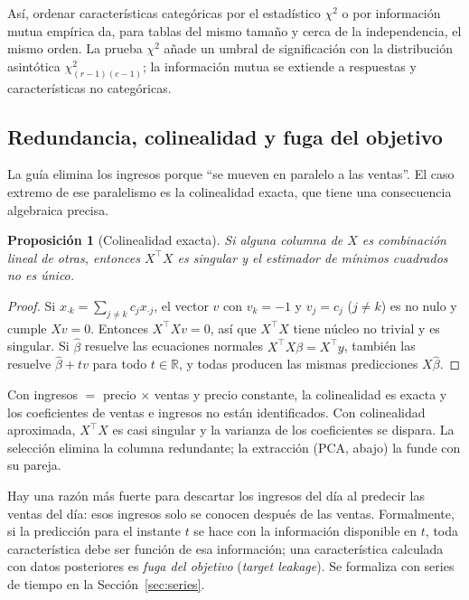 \documentclass[11pt]{article}
\newtheorem{proposicion}[teorema]{Proposición}
\theoremstyle{definition}
\theoremstyle{remark}
\newcommand{\R}{\mathbb{R}}
\begin{document}
\noindent Así, ordenar características categóricas por el estadístico $\chi^2$ o por información mutua empírica da, para tablas del mismo tamaño y cerca de la independencia, el mismo orden. La prueba $\chi^2$ añade un umbral de significación con la distribución asintótica $\chi^2_{(r-1)(c-1)}$; la información mutua se extiende a respuestas y características no categóricas.

\subsection{Redundancia, colinealidad y fuga del objetivo}\label{sec:redundancia}

\noindent La guía elimina los ingresos porque ``se mueven en paralelo a las ventas''. El caso extremo de ese paralelismo es la colinealidad exacta, que tiene una consecuencia algebraica precisa.

\begin{proposicion}[Colinealidad exacta]\label{prop:colineal}
\noindent Si alguna columna de $X$ es combinación lineal de otras, entonces $X^\top X$ es singular y el estimador de mínimos cuadrados no es único.
\end{proposicion}
\begin{proof}
\noindent Si $x_{\cdot k}=\sum_{j\ne k}c_jx_{\cdot j}$, el vector $v$ con $v_k=-1$ y $v_j=c_j$ ($j\ne k$) es no nulo y cumple $Xv=0$. Entonces $X^\top Xv=0$, así que $X^\top X$ tiene núcleo no trivial y es singular. Si $\hat\beta$ resuelve las ecuaciones normales $X^\top X\beta=X^\top y$, también las resuelve $\hat\beta+tv$ para todo $t\in\R$, y todas producen las mismas predicciones $X\hat\beta$.
\end{proof}

\noindent Con ingresos $=$ precio $\times$ ventas y precio constante, la colinealidad es exacta y los coeficientes de ventas e ingresos no están identificados. Con colinealidad aproximada, $X^\top X$ es casi singular y la varianza de los coeficientes se dispara. La selección elimina la columna redundante; la extracción (PCA, abajo) la funde con su pareja.

\medskip

\noindent Hay una razón más fuerte para descartar los ingresos del día al predecir las ventas del día: esos ingresos solo se conocen después de las ventas. Formalmente, si la predicción para el instante $t$ se hace con la información disponible en $t$, toda característica debe ser función de esa información; una característica calculada con datos posteriores es \emph{fuga del objetivo} (\emph{target leakage}). Se formaliza con series de tiempo en la Sección~\ref{sec:series}.
\end{document}
